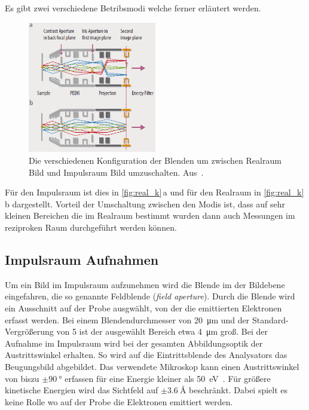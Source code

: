         Es gibt zwei verschiedene Betribsmodi welche ferner erläutert werden.
        \begin{figure}
            \centering
            \caption{Die verschiedenen Konfiguration der Blenden um zwischen Realraum Bild und Impulsraum Bild umzuschalten. Aus~\cite{Focus}.}
            \label{fig:real_k}
            \includegraphics[width=0.5\textwidth]{./content/Real_k.PNG}
        \end{figure}
        Für den Impulsraum ist dies in \autoref{fig:real_k}\,a und für den Realraum in \autoref{fig:real_k}\,b dargestellt.
        Vorteil der Umschaltung zwischen den Modis ist, dass auf sehr kleinen Bereichen die im Realraum bestimmt wurden dann auch Messungen im reziproken Raum durchgeführt werden können.


        \subsection{Impulsraum Aufnahmen}
            Um ein Bild im Impulsraum aufzunehmen wird die Blende im der Bildebene eingefahren, die so genannte Feldblende (\textit{field aperture}).
            Durch die Blende wird ein Ausschnitt auf der Probe ausgwählt, von der die emittierten Elektronen erfasst werden.
            Bei einem Blendendurchmesser von \SI{20}{\micro\meter} und der Standard-Vergrößerung von \num{5} ist der ausgewählt Bereich etwa \SI{4}{\micro\meter} groß.
            Bei der Aufnahme im Impulsraum wird bei der gesamten Abbildungsoptik der Austrittswinkel erhalten.
            So wird auf die Eintrittsblende des Analysators das Beugungsbild abgebildet.
            Das verwendete Mikroskop kann einen Austrittswinkel von biszu $\pm\SI{90}{\degree}$ erfassen für eine Energie kleiner als \SI{50}{\electronvolt}~\cite[21]{SPECS-MM}.
            Für größere kinetische Energien wird das Sichtfeld auf $\pm\SI{3.6}{\angstrom}$ beschränkt.
            Dabei spielt es keine Rolle wo auf der Probe die Elektronen emittiert werden.

